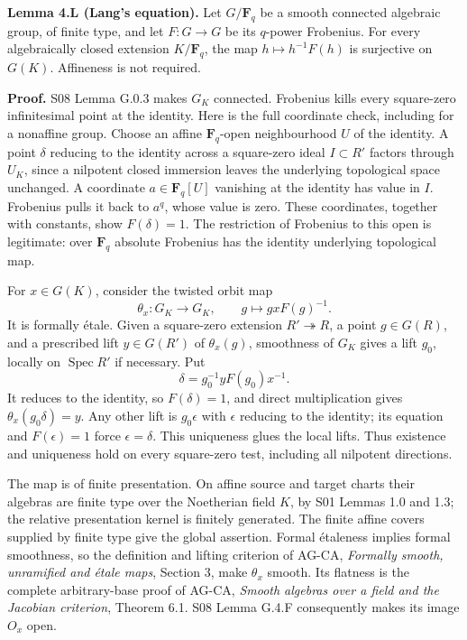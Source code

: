\documentclass[11pt,a4paper,openany]{report}
\begin{document}
\textbf{Lemma 4.L (Lang's equation).} Let \(G/\mathbf F_q\) be a smooth connected algebraic group, of finite type, and let \(F:G\to G\) be its \(q\)-power Frobenius. For every algebraically closed extension \(K/\mathbf F_q\), the map \(h\mapsto h^{-1}F(h)\) is surjective on \(G(K)\). Affineness is not required.

\textbf{Proof.} S08 Lemma G.0.3 makes \(G_K\) connected. Frobenius kills every square-zero infinitesimal point at the identity. Here is the full coordinate check, including for a nonaffine group. Choose an affine \(\mathbf F_q\)-open neighbourhood \(U\) of the identity. A point \(\delta\) reducing to the identity across a square-zero ideal \(I\subset R'\) factors through \(U_K\), since a nilpotent closed immersion leaves the underlying topological space unchanged. A coordinate \(a\in\mathbf F_q[U]\) vanishing at the identity has value in \(I\). Frobenius pulls it back to \(a^q\), whose value is zero. These coordinates, together with constants, show \(F(\delta)=1\). The restriction of Frobenius to this open is legitimate: over \(\mathbf F_q\) absolute Frobenius has the identity underlying topological map.

For \(x\in G(K)\), consider the twisted orbit map \[
 \theta_x:G_K\longrightarrow G_K,\qquad g\longmapsto gxF(g)^{-1}.
\] It is formally étale. Given a square-zero extension \(R'\twoheadrightarrow R\), a point \(g\in G(R)\), and a prescribed lift \(y\in G(R')\) of \(\theta_x(g)\), smoothness of \(G_K\) gives a lift \(g_0\), locally on \(\operatorname{Spec}R'\) if necessary. Put \[
 \delta=g_0^{-1}yF(g_0)x^{-1}.
\] It reduces to the identity, so \(F(\delta)=1\), and direct multiplication gives \(\theta_x(g_0\delta)=y\). Any other lift is \(g_0\epsilon\) with \(\epsilon\) reducing to the identity; its equation and \(F(\epsilon)=1\) force \(\epsilon=\delta\). This uniqueness glues the local lifts. Thus existence and uniqueness hold on every square-zero test, including all nilpotent directions.

The map is of finite presentation. On affine source and target charts their algebras are finite type over the Noetherian field \(K\), by S01 Lemmas 1.0 and 1.3; the relative presentation kernel is finitely generated. The finite affine covers supplied by finite type give the global assertion. Formal étaleness implies formal smoothness, so the definition and lifting criterion of AG-CA, \emph{Formally smooth, unramified and étale maps}, Section 3, make \(\theta_x\) smooth. Its flatness is the complete arbitrary-base proof of AG-CA, \emph{Smooth algebras over a field and the Jacobian criterion}, Theorem 6.1. S08 Lemma G.4.F consequently makes its image \(O_x\) open.
\end{document}
